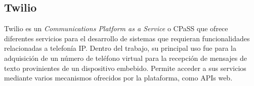 \subsection{Twilio}

Twilio es un \textit{Communications Platform as a Service} o CPaSS que ofrece diferentes servicios para el desarrollo de sistemas que requieran funcionalidades relacionadas a telefonía IP\citep{TWILIO:1}. Dentro del trabajo, su principal uso fue para la adquisición de un número de teléfono virtual para la recepción de mensajes de texto provinientes de un dispositivo embebido. Permite acceder a sus servicios mediante varios mecanismos ofrecidos por la plataforma, como APIs web.
